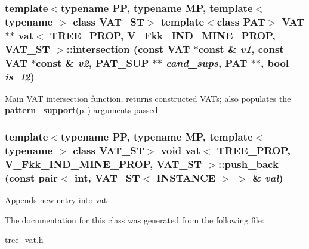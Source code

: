 \subsubsection{\setlength{\rightskip}{0pt plus 5cm}template$<$typename PP, typename MP, template$<$ typename $>$ class VAT\_\-ST$>$ template$<$class PAT$>$ {\bf VAT}$\ast$$\ast$ {\bf vat}$<$ TREE\_\-PROP, V\_\-Fkk\_\-IND\_\-MINE\_\-PROP, VAT\_\-ST $>$::intersection (const {\bf VAT} $\ast$const \& {\em v1}, const {\bf VAT} $\ast$const \& {\em v2}, {\bf PAT\_\-SUP} $\ast$$\ast$ {\em cand\_\-sups}, PAT $\ast$$\ast$, bool {\em is\_\-l2})\hspace{0.3cm}{\tt  [inline, static]}}\label{classvat_3_01TREE__PROP_00_01V__Fkk__IND__MINE__PROP_00_01VAT__ST_01_4_e0}


Main VAT intersection function, returns constructed VATs; also populates the {\bf pattern\_\-support}{\rm (p.\,\pageref{classpattern__support})} arguments passed 
\subsubsection{\setlength{\rightskip}{0pt plus 5cm}template$<$typename PP, typename MP, template$<$ typename $>$ class VAT\_\-ST$>$ void {\bf vat}$<$ TREE\_\-PROP, V\_\-Fkk\_\-IND\_\-MINE\_\-PROP, VAT\_\-ST $>$::push\_\-back (const pair$<$ int, VAT\_\-ST$<$ {\bf INSTANCE} $>$ $>$ \& {\em val})\hspace{0.3cm}{\tt  [inline]}}\label{classvat_3_01TREE__PROP_00_01V__Fkk__IND__MINE__PROP_00_01VAT__ST_01_4_a6}


Appends new entry into vat 

The documentation for this class was generated from the following file:\begin{CompactItemize}
\item 
tree\_\-vat.h\end{CompactItemize}
